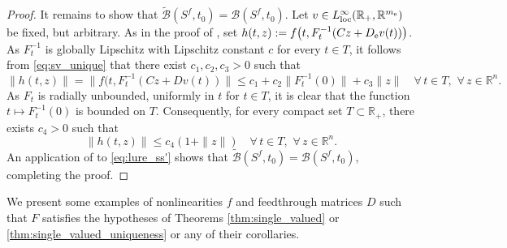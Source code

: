 \documentclass[a4paper,11pt]{article}
\newcommand{\R}{\mathbb R}
\newcommand{\sB}{{\mathcal B}}
\numberwithin{equation}{section}
\numberwithin{figure}{section}
\numberwithin{table}{section}
\begin{document}
\begin{proof}
It remains to show that $\tilde\sB(S^f,t_0)=\sB(S^f,t_0)$. Let $v\in L^\infty_{\rm loc}(\R_+,\R^{m_{\rm e}})$ be fixed, but arbitrary. As in the proof of , set $h(t,z):=f\big(t,F_t^{-1}(Cz+D_{\rm e}v(t))\big)$. As $F_t^{-1}$ is globally Lipschitz
with Lipschitz constant $c$ for every $t\in T$, it follows from \eqref{eq:sv_unique} that there exist $c_1, c_2, c_3>0$ such that
\[
\|h(t,z)\|=\|f(t,F_t^{-1}(Cz+Dv(t))\|\leq c_1+c_2\|F_t^{-1}(0)\|+c_3\|z\|\quad\forall\,t\in T,\,\,\forall\,z\in\R^n.
\]
As $F_t$ is radially unbounded, uniformly in $t$ for $t\in T$, it is clear that the function $t\mapsto F_t^{-1}(0)$ is bounded on $T$. Consequently, for every compact set $T\subset\R_+$, there exists $c_4>0$ such that
\[
\|h(t,z)\|\leq c_4(1+\|z\|)\quad\forall\,t\in T,\,\,\forall\,z\in\R^n.
\]
An application of \cite[Proposition 2.1.19]{hp05} to \eqref{eq:lure_ss'} shows
that $\tilde\sB(S^f,t_0)=\sB(S^f,t_0)$, completing the proof.
\end{proof}
%
We present some examples of nonlinearities $f$ and feedthrough matrices $D$ such that $F$ satisfies
the hypotheses  of Theorems \ref{thm:single_valued} or \ref{thm:single_valued_uniqueness} or any of their corollaries.
%
\end{document}
